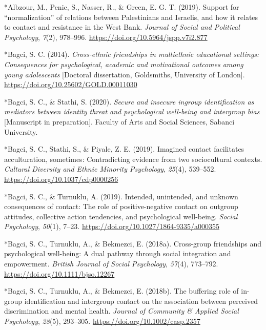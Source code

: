 \documentclass[12pt, letterpaper]{article}
\begin{document}
\begingroup

\noindent \setlength{\parindent}{-0.5in} \setlength{\leftskip}{0.5in}
\small

\hypertarget{refs}{}
\leavevmode\hypertarget{ref-3201}{}%
*Albzour, M., Penic, S., Nasser, R., \& Green, E. G. T. (2019). Support
for ``normalization'' of relations between Palestinians and Israelis,
and how it relates to contact and resistance in the West Bank.
\emph{Journal of Social and Political Psychology}, \emph{7}(2),
978--996. \url{https://doi.org/10.5964/jspp.v7i2.877}

\leavevmode\hypertarget{ref-2023}{}%
*Bagci, S. C. (2014). \emph{Cross-ethnic friendships in multiethnic
educational settings: Consequences for psychological, academic and
motivational outcomes among young adolescents} {[}Doctoral dissertation,
Goldsmiths, University of London{]}.
\url{https://doi.org/10.25602/GOLD.00011030}

\leavevmode\hypertarget{ref-2395}{}%
*Bagci, S. C., \& Stathi, S. (2020). \emph{Secure and insecure ingroup
identification as mediators between identity threat and psychological
well-being and intergroup bias} {[}Manuscript in preparation{]}. Faculty
of Arts and Social Sciences, Sabanci University.

\leavevmode\hypertarget{ref-423}{}%
*Bagci, S. C., Stathi, S., \& Piyale, Z. E. (2019). Imagined contact
facilitates acculturation, sometimes: Contradicting evidence from two
sociocultural contexts. \emph{Cultural Diversity and Ethnic Minority
Psychology}, \emph{25}(4), 539--552.
\url{https://doi.org/10.1037/cdp0000256}

\leavevmode\hypertarget{ref-322}{}%
*Bagci, S. C., \& Turnuklu, A. (2019). Intended, unintended, and unknown
consequences of contact: The role of positive-negative contact on
outgroup attitudes, collective action tendencies, and psychological
well-being. \emph{Social Psychology}, \emph{50}(1), 7--23.
\url{https://doi.org/10.1027/1864-9335/a000355}

\leavevmode\hypertarget{ref-414}{}%
*Bagci, S. C., Turnuklu, A., \& Bekmezci, E. (2018a). Cross-group
friendships and psychological well-being: A dual pathway through social
integration and empowerment. \emph{British Journal of Social
Psychology}, \emph{57}(4), 773--792.
\url{https://doi.org/10.1111/bjso.12267}

\leavevmode\hypertarget{ref-2257}{}%
*Bagci, S. C., Turnuklu, A., \& Bekmezci, E. (2018b). The buffering role
of in-group identification and intergroup contact on the association
between perceived discrimination and mental health. \emph{Journal of
Community \& Applied Social Psychology}, \emph{28}(5), 293--305.
\url{https://doi.org/10.1002/casp.2357}
\end{document}
